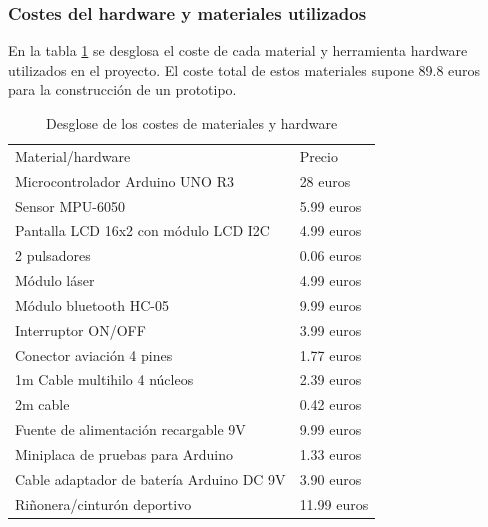 \subsubsection{Costes del hardware y materiales utilizados}

En la tabla \ref{tab:preciomateriales} se desglosa el coste de cada material y herramienta hardware utilizados en el proyecto. El coste total de estos materiales supone 89.8 euros para la construcción de un prototipo.


\begin{table}[]
\begin{tabular}{
>{\columncolor[HTML]{DAE8FC}}l 
>{\columncolor[HTML]{EFEFEF}}l }
\cellcolor[HTML]{C0D5E5}Material/hardware & \cellcolor[HTML]{C0D5E5}Precio \\
Microcontrolador Arduino UNO R3           & 28 euros                       \\
Sensor MPU-6050                           & 5.99 euros                     \\
Pantalla LCD 16x2 con módulo LCD I2C      & 4.99 euros                     \\
2 pulsadores                              & 0.06 euros                     \\
Módulo láser                              & 4.99 euros                     \\
Módulo bluetooth HC-05                    & 9.99 euros                     \\
Interruptor ON/OFF                        & 3.99 euros                     \\
Conector aviación 4 pines                 & 1.77 euros                     \\
1m Cable multihilo 4 núcleos              & 2.39 euros                     \\
2m cable                                  & 0.42 euros                     \\
Fuente de alimentación recargable 9V      & 9.99 euros                     \\
Miniplaca de pruebas para Arduino         & 1.33 euros                     \\
Cable adaptador de batería Arduino DC 9V  & 3.90 euros                     \\
Riñonera/cinturón deportivo               & 11.99 euros                   
\end{tabular}
\label{tab:preciomateriales}
\caption{Desglose de los costes de materiales y hardware}
\end{table}

